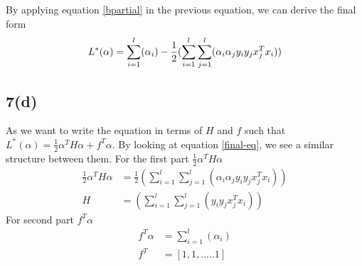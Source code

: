 By applying equation \ref{bpartial} in the previous equation, we can derive the final form
\begin{equation}\label{final-eq}
L^*(\alpha) = \sum_{i=1}^l(\alpha_i) - \frac{1}{2}(\sum_{i=1}^l\sum_{j=1}^l(\alpha_i \alpha_j y_i y_j x_j^T x_i))\\
\end{equation}

\subsection*{7(d)}
As we want to write the equation in terms of $H$ and $f$ such that $L^*(\alpha) = \frac{1}{2} \alpha^TH\alpha + f^T\alpha$. By looking at equation \ref{final-eq}, we see a similar structure between them. For the first part $\frac{1}{2} \alpha^TH\alpha $
\begin{equation*}
\begin{aligned}
\frac{1}{2}\alpha^TH\alpha &= \frac{1}{2}(\sum_{i=1}^l\sum_{j=1}^l(\alpha_i \alpha_j y_i y_j x_j^T x_i))\\
H &= (\sum_{i=1}^l\sum_{j=1}^l(y_i y_j x_j^T x_i))
\end{aligned}
\end{equation*}
For second part $f^T\alpha$
\begin{equation*}
\begin{aligned}
f^T\alpha &= \sum_{i=1}^l(\alpha_i)\\
f^T &= [1,1,.....1]
\end{aligned}
\end{equation*}

